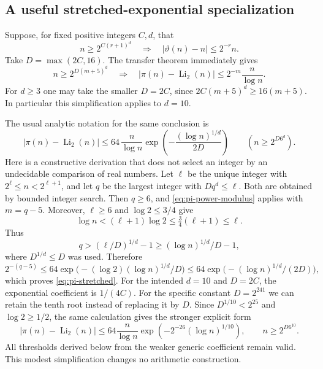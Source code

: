 \subsection{A useful stretched-exponential specialization}

Suppose, for fixed positive integers $C,d$, that
\begin{equation}\label{eq:theta-power-modulus}
 n\ge2^{C(r+1)^d}\quad\Longrightarrow\quad
 |\vartheta(n)-n|\le2^{-r}n.
\end{equation}
Take $D=\max(2C,16)$.  The transfer theorem immediately gives
\begin{equation}\label{eq:pi-power-modulus}
 n\ge2^{D(m+5)^d}\quad\Longrightarrow\quad
 |\pi(n)-\operatorname{Li}_2(n)|\le2^{-m}\frac n{\log n}.
\end{equation}
For $d\ge3$ one may take the smaller $D=2C$, since
$2C(m+5)^d\ge16(m+5)$.  In particular this simplification applies to
$d=10$.

The usual analytic notation for the same conclusion is
\begin{equation}\label{eq:pi-stretched}
 |\pi(n)-\operatorname{Li}_2(n)|
 \le64\,\frac n{\log n}
       \exp\left(-\frac{(\log n)^{1/d}}{2D}\right)
 \qquad(n\ge2^{D6^d}).
\end{equation}
Here is a constructive derivation that does not select an integer by an
undecidable comparison of real numbers.  Let $\ell$ be the unique integer
with $2^\ell\le n<2^{\ell+1}$, and let $q$ be the largest integer with
$Dq^d\le\ell$.  Both are obtained by bounded integer search.  Then
$q\ge6$, and \eqref{eq:pi-power-modulus} applies with $m=q-5$.
Moreover, $\ell\ge6$ and $\log2\le3/4$ give
\[
 \log n<(\ell+1)\log2\le\tfrac34(\ell+1)\le\ell.
\]
Thus
\[
 q> (\ell/D)^{1/d}-1
      \ge(\log n)^{1/d}/D-1,
\]
where $D^{1/d}\le D$ was used.  Therefore
\[
 2^{-(q-5)}\le64\exp\bigl(-(\log2)(\log n)^{1/d}/D\bigr)
       \le64\exp\bigl(-(\log n)^{1/d}/(2D)\bigr),
\]
which proves \eqref{eq:pi-stretched}.
For the intended $d=10$ and $D=2C$, the exponential coefficient is
$1/(4C)$.
For the specific constant $D=2^{241}$ we can retain the tenth root
instead of replacing it by $D$. Since $D^{1/10}<2^{25}$ and
$\log2\ge1/2$, the same calculation gives the stronger explicit form
\begin{equation}\label{eq:fixed-stretched}
 |\pi(n)-\operatorname{Li}_2(n)|
 \le64\frac n{\log n}
       \exp\!\left(-2^{-26}(\log n)^{1/10}\right),
 \qquad n\ge2^{D6^{10}}.
\end{equation}
All thresholds derived below from the weaker generic coefficient remain
valid. This modest simplification changes no arithmetic construction.


